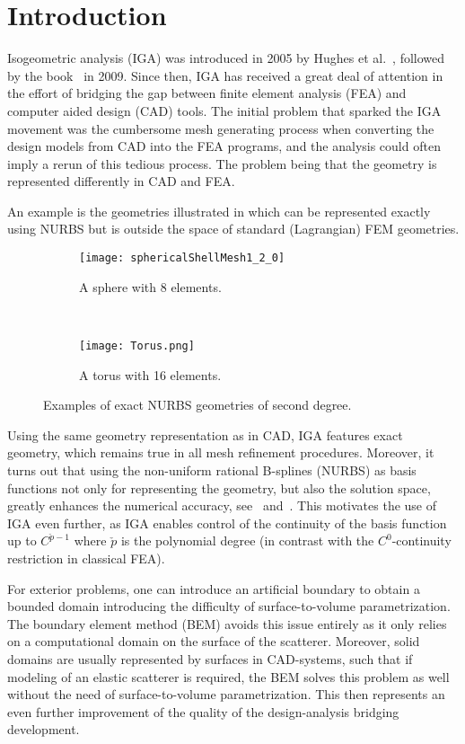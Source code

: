 \section{Introduction}
Isogeometric analysis (IGA) was introduced in 2005 by Hughes et al.~\cite{Hughes2005iac}, followed by the book~\cite{Cottrell2009iat} in 2009. Since then, IGA has received a great deal of attention in the effort of bridging the gap between finite element analysis (FEA) and computer aided design (CAD) tools. The initial problem that sparked the IGA movement was the cumbersome mesh generating process when converting the design models from CAD into the FEA programs, and the analysis could often imply a rerun of this tedious process. The problem being that the geometry is represented differently in CAD and FEA. 

An example is the geometries illustrated in  which can be represented exactly using NURBS but is outside the space of standard (Lagrangian) FEM geometries.
\begin{figure}
	\centering
	\begin{subfigure}[b]{0.3\textwidth}
		\centering
		\texttt{[image: sphericalShellMesh1\_2\_0]}
		\caption{A sphere with 8 elements.}
		\label{Fig3:sphere}
	\end{subfigure}
	~    
	\begin{subfigure}[b]{0.35\textwidth}
		\centering
		\texttt{[image: Torus.png]}
		\caption{A torus with 16 elements.}
		\label{Fig3:Torus}
	\end{subfigure}
	\caption{Examples of exact NURBS geometries of second degree.}
	\label{Fig3:NURBSexamples}
\end{figure} 
Using the same geometry representation as in CAD, IGA features exact geometry, which remains true in all mesh refinement procedures. Moreover, it turns out that using the non-uniform rational B-splines (NURBS) as basis functions not only for representing the geometry, but also the solution space, greatly enhances the numerical accuracy, see~\cite{BeiraodaVeiga2011sef} and~\cite{BeiraodaVeiga2014mao}. This motivates the use of IGA even further, as IGA enables control of the continuity of the basis function up to $C^{\check{p}-1}$ where $\check{p}$ is the polynomial degree (in contrast with the $C^0$-continuity restriction in classical FEA). 

For exterior problems, one can introduce an artificial boundary to obtain a bounded domain introducing the difficulty of surface-to-volume parametrization. The boundary element method (BEM) avoids this issue entirely as it only relies on a computational domain on the surface of the scatterer. Moreover, solid domains are usually represented by surfaces in CAD-systems, such that if modeling of an elastic scatterer is required, the BEM solves this problem as well without the need of surface-to-volume parametrization. This then represents an even further improvement of the quality of the design-analysis bridging development.

